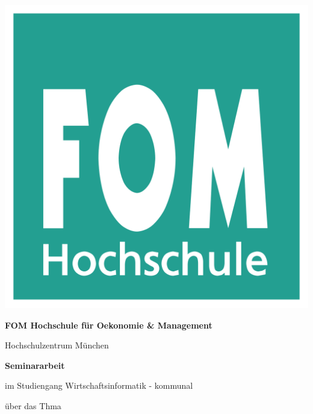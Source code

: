 \begin{center}

\begin{center}
\includegraphics[scale=0.07]{img/FOM-Logo.png}
\end{center}

\begin{center}
\Large{\textbf{
FOM Hochschule für Oekonomie \& Management \\
}}
\end{center}

\begin{center}
\large{Hochschulzentrum München \\}
\end{center}

\vspace{3em}

\begin{center}
\large{\textbf{Seminararbeit}}
\end{center}

\begin{center}
im Studiengang Wirtschaftsinformatik - kommunal
\end{center}

\vspace{2em}

\begin{center}
über das Thma
\end{center}


\end{center}
